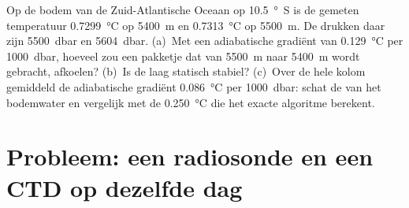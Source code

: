 \begin{exercise}[$\star\star\star$]\label{exo:b1:fluid-envelopes-structure:12}
Op de bodem van de Zuid-Atlantische Oceaan op \qty{10.5}{\degree S} is de gemeten temperatuur \qty{0.7299}{\celsius} op \qty{5400}{m} en \qty{0.7313}{\celsius} op \qty{5500}{m}. De drukken daar zijn \qty{5500}{dbar} en \qty{5604}{dbar}. (a)~Met een adiabatische gradiënt van \qty{0.129}{\celsius} per \qty{1000}{dbar}, hoeveel zou een pakketje dat van \qty{5500}{m} naar \qty{5400}{m} wordt gebracht, afkoelen? (b)~Is de laag statisch stabiel? (c)~Over de hele kolom gemiddeld de adiabatische gradiënt \qty{0.086}{\celsius} per \qty{1000}{dbar}: schat de  van het bodemwater en vergelijk met de \qty{0.250}{\celsius} die het exacte algoritme berekent.
\end{exercise}

\section{Probleem: een radiosonde en een CTD op dezelfde dag}


